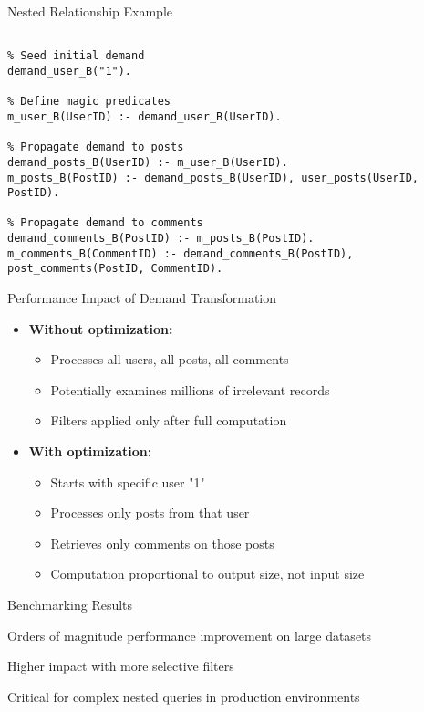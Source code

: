 \documentclass{beamer}
\begin{document}
\begin{frame}[fragile]{Nested Relationship Example}
\begin{lstlisting}[basicstyle=\scriptsize\ttfamily]
% For a query like: user(id: "1") { posts { comments { author } } }

% Seed initial demand
demand_user_B("1").

% Define magic predicates
m_user_B(UserID) :- demand_user_B(UserID).

% Propagate demand to posts
demand_posts_B(UserID) :- m_user_B(UserID).
m_posts_B(PostID) :- demand_posts_B(UserID), user_posts(UserID, PostID).

% Propagate demand to comments
demand_comments_B(PostID) :- m_posts_B(PostID).
m_comments_B(CommentID) :- demand_comments_B(PostID), post_comments(PostID, CommentID).
\end{lstlisting}
\end{frame}

\begin{frame}{Performance Impact of Demand Transformation}
  \begin{itemize}
    \item \textbf{Without optimization:}
      \begin{itemize}
        \item Processes all users, all posts, all comments
        \item Potentially examines millions of irrelevant records
        \item Filters applied only after full computation
      \end{itemize}
    \item \textbf{With optimization:}
      \begin{itemize}
        \item Starts with specific user "1"
        \item Processes only posts from that user
        \item Retrieves only comments on those posts
        \item Computation proportional to output size, not input size
      \end{itemize}
  \end{itemize}
  
  \begin{block}{Benchmarking Results}
    \item Orders of magnitude performance improvement on large datasets
    \item Higher impact with more selective filters
    \item Critical for complex nested queries in production environments
  \end{block}
\end{frame}
\end{document}
